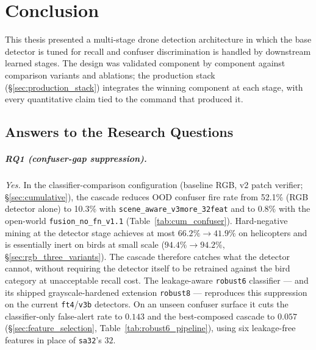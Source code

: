 \chapter{Conclusion}
\label{ch:conclusion}

This thesis presented a multi-stage drone detection architecture in which the base detector is tuned for recall and confuser discrimination is handled by downstream learned stages. The design was validated component by component against comparison variants and ablations; the production stack (\S\ref{sec:production_stack}) integrates the winning component at each stage, with every quantitative claim tied to the command that produced it.

\section{Answers to the Research Questions}
\label{sec:rq_answers}

\paragraph{RQ1 (confuser-gap suppression).}
\emph{Yes.} In the classifier-comparison configuration (baseline RGB, v2 patch verifier; \S\ref{sec:cumulative}), the cascade reduces OOD confuser fire rate from 52.1\% (RGB detector alone) to 10.3\% with \texttt{scene\_aware\_v3more\_32feat} and to 0.8\% with the open-world \texttt{fusion\_no\_fn\_v1.1} (Table~\ref{tab:cum_confuser}). Hard-negative mining at the detector stage achieves at most $66.2\% \to 41.9\%$ on helicopters and is essentially inert on birds at small scale ($94.4\% \to 94.2\%$, \S\ref{sec:rgb_three_variants}). The cascade therefore catches what the detector cannot, without requiring the detector itself to be retrained against the bird category at unacceptable recall cost. The leakage-aware \texttt{robust6} classifier --- and its shipped grayscale-hardened extension \texttt{robust8} --- reproduces this suppression on the current \texttt{ft4}/\texttt{v3b} detectors. On an unseen confuser surface it cuts the classifier-only false-alert rate to $0.143$ and the best-composed cascade to $0.057$ (\S\ref{sec:feature_selection}, Table~\ref{tab:robust6_pipeline}), using six leakage-free features in place of \texttt{sa32}'s $32$.


